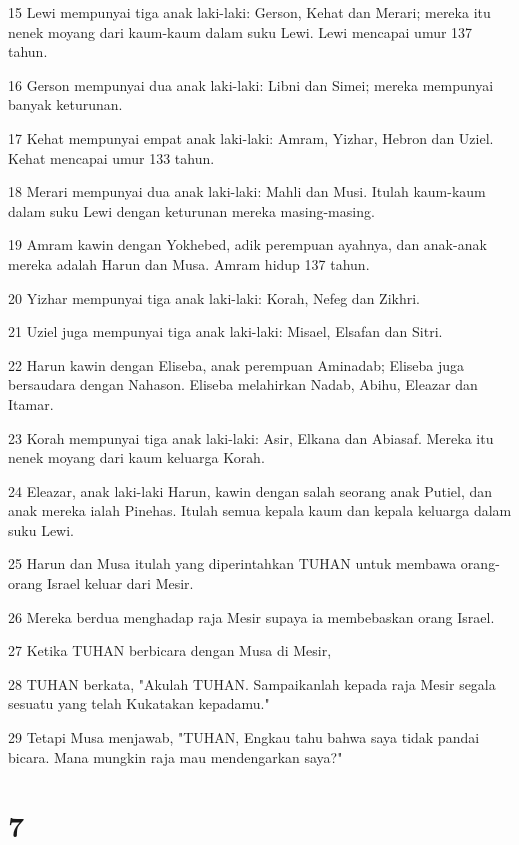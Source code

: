 \par 15 Lewi mempunyai tiga anak laki-laki: Gerson, Kehat dan Merari; mereka itu nenek moyang dari kaum-kaum dalam suku Lewi. Lewi mencapai umur 137 tahun.
\par 16 Gerson mempunyai dua anak laki-laki: Libni dan Simei; mereka mempunyai banyak keturunan.
\par 17 Kehat mempunyai empat anak laki-laki: Amram, Yizhar, Hebron dan Uziel. Kehat mencapai umur 133 tahun.
\par 18 Merari mempunyai dua anak laki-laki: Mahli dan Musi. Itulah kaum-kaum dalam suku Lewi dengan keturunan mereka masing-masing.
\par 19 Amram kawin dengan Yokhebed, adik perempuan ayahnya, dan anak-anak mereka adalah Harun dan Musa. Amram hidup 137 tahun.
\par 20 Yizhar mempunyai tiga anak laki-laki: Korah, Nefeg dan Zikhri.
\par 21 Uziel juga mempunyai tiga anak laki-laki: Misael, Elsafan dan Sitri.
\par 22 Harun kawin dengan Eliseba, anak perempuan Aminadab; Eliseba juga bersaudara dengan Nahason. Eliseba melahirkan Nadab, Abihu, Eleazar dan Itamar.
\par 23 Korah mempunyai tiga anak laki-laki: Asir, Elkana dan Abiasaf. Mereka itu nenek moyang dari kaum keluarga Korah.
\par 24 Eleazar, anak laki-laki Harun, kawin dengan salah seorang anak Putiel, dan anak mereka ialah Pinehas. Itulah semua kepala kaum dan kepala keluarga dalam suku Lewi.
\par 25 Harun dan Musa itulah yang diperintahkan TUHAN untuk membawa orang-orang Israel keluar dari Mesir.
\par 26 Mereka berdua menghadap raja Mesir supaya ia membebaskan orang Israel.
\par 27 Ketika TUHAN berbicara dengan Musa di Mesir,
\par 28 TUHAN berkata, "Akulah TUHAN. Sampaikanlah kepada raja Mesir segala sesuatu yang telah Kukatakan kepadamu."
\par 29 Tetapi Musa menjawab, "TUHAN, Engkau tahu bahwa saya tidak pandai bicara. Mana mungkin raja mau mendengarkan saya?"

\chapter{7}

